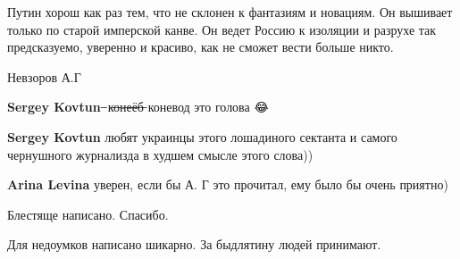 \begin{itemize}
Путин хорош как раз тем, что не склонен к фантазиям и новациям. Он вышивает
только по старой имперской канве. Он ведет Россию к изоляции и разрухе так
предсказуемо, уверенно и красиво, как не сможет вести больше никто.

Невзоров А.Г

\begin{itemize}
 
\textbf{Sergey Kovtun}  ̶ к̶о̶н̶е̶ё̶б̶ коневод это голова 😂

 
\textbf{Sergey Kovtun} любят украинцы этого лошадиного сектанта и самого чернушного журнализда в худшем смысле этого слова))

 
\textbf{Arina Levina} уверен, если бы А. Г это прочитал, ему было бы очень приятно)
\end{itemize}

 
Блестяще написано. Спасибо.

\begin{itemize}
 
Для недоумков написано шикарно. За быдлятину людей принимают.

 

\end{itemize}
\end{itemize}
